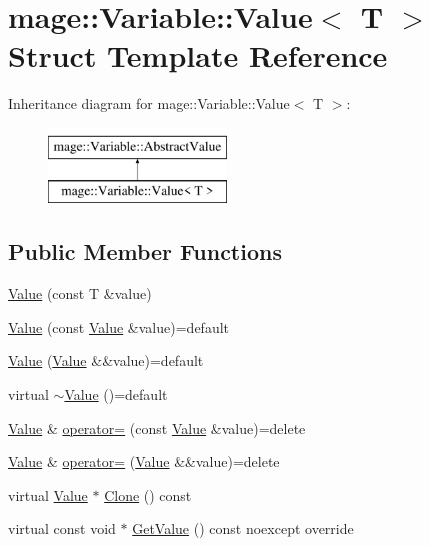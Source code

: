 \hypertarget{structmage_1_1_variable_1_1_value}{}\section{mage\+:\+:Variable\+:\+:Value$<$ T $>$ Struct Template Reference}
\label{structmage_1_1_variable_1_1_value}
Inheritance diagram for mage\+:\+:Variable\+:\+:Value$<$ T $>$\+:\begin{figure}[H]
\begin{center}
\leavevmode
\includegraphics[height=2.000000cm]{structmage_1_1_variable_1_1_value}
\end{center}
\end{figure}
\subsection*{Public Member Functions}
\begin{DoxyCompactItemize}
\item 
\hyperlink{structmage_1_1_variable_1_1_value_a36aa54fe0b4e80228e7dbee545d9cb38}{Value} (const T \&value)
\item 
\hyperlink{structmage_1_1_variable_1_1_value_a962f7d07d601fd5d1a2c24f892607e16}{Value} (const \hyperlink{structmage_1_1_variable_1_1_value}{Value} \&value)=default
\item 
\hyperlink{structmage_1_1_variable_1_1_value_aeadb858e9a40f211c787cacc2fb2843b}{Value} (\hyperlink{structmage_1_1_variable_1_1_value}{Value} \&\&value)=default
\item 
virtual \hyperlink{structmage_1_1_variable_1_1_value_ab77eb80d4786a060778dc41ee73c1371}{$\sim$\+Value} ()=default
\item 
\hyperlink{structmage_1_1_variable_1_1_value}{Value} \& \hyperlink{structmage_1_1_variable_1_1_value_a19c45282edac9ffaa0f687b7dd414392}{operator=} (const \hyperlink{structmage_1_1_variable_1_1_value}{Value} \&value)=delete
\item 
\hyperlink{structmage_1_1_variable_1_1_value}{Value} \& \hyperlink{structmage_1_1_variable_1_1_value_a2185d5eeb8f321a7e4f6d97463af4987}{operator=} (\hyperlink{structmage_1_1_variable_1_1_value}{Value} \&\&value)=delete
\item 
virtual \hyperlink{structmage_1_1_variable_1_1_value}{Value} $\ast$ \hyperlink{structmage_1_1_variable_1_1_value_a4d59fec74fc5d25ecca86054ecc8d15d}{Clone} () const
\item 
virtual const void $\ast$ \hyperlink{structmage_1_1_variable_1_1_value_af560f450757bd5b40871162cbaf911b3}{Get\+Value} () const noexcept override
\end{DoxyCompactItemize}
